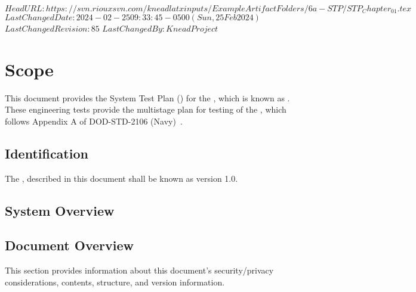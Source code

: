 \svnidlong
{$HeadURL: https://svn.riouxsvn.com/kneadlatxinputs/ExampleArtifactFolders/6a-STP/STP_Chapter_01.tex $}
{$LastChangedDate: 2024-02-25 09:33:45 -0500 (Sun, 25 Feb 2024) $}
{$LastChangedRevision: 85 $}
{$LastChangedBy: KneadProject $}

\chapter{Scope}
\label{loc:Scope}
% 

This document provides the System Test Plan (\STP) for the \ThisSystem, which is known as \ThisSys.
These engineering tests provide the multistage plan for testing of the \ThisSys, which follows Appendix A of DOD-STD-2106 (Navy)~\cite{ref__DOD_STD_2106_NAVY}.


\section{Identification}
% 

The \ThisSys, described in this document shall be known as \ThisSys version 1.0.


\section{System Overview}
\label{loc:SystemOverview}
% 




\section{Document Overview}
\label{loc:DocumentOverview}
% 

This section provides information about this document's security/privacy considerations, contents, structure, and version information.








